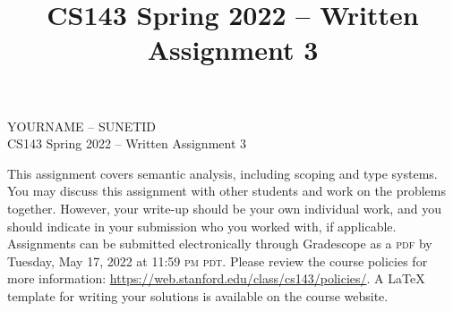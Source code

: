 \documentclass[11pt]{article}
\title{CS143 Spring 2022 -- Written Assignment 3}
\newcommand\duedate{Tuesday, May 17, 2022 at 11:59 \textsc{pm pdt}}
\begin{document}
\begin{center}
\LARGE YOURNAME -- SUNETID \\
\LARGE CS143 Spring 2022 -- Written Assignment 3
\end{center}

This assignment covers semantic analysis, including scoping and type systems.
You may discuss this assignment with other students and work on the problems
together. However, your write-up should be your own individual work, and you
should indicate in your submission who you worked with, if applicable.
Assignments can be submitted electronically through Gradescope as a
\textsc{pdf} by \duedate. Please review the course policies for more
information: \url{https://web.stanford.edu/class/cs143/policies/}. A \LaTeX{}
template for writing your solutions is available on the course website.
\end{document}
